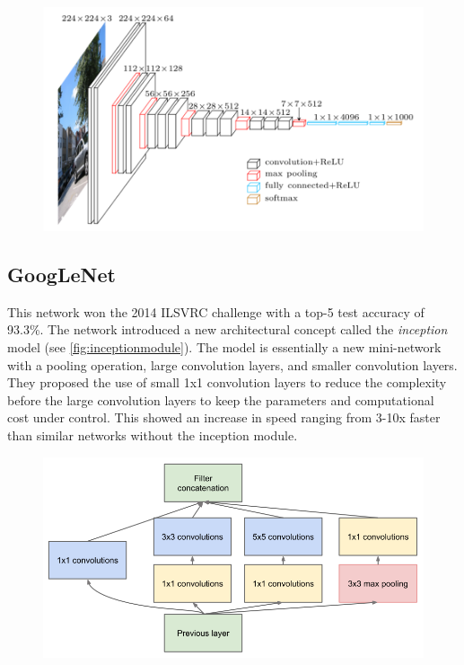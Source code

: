 \begin{figure}[H]
	\centering
	\includegraphics[width=0.7\linewidth]{fig/vgg16.png}
	\label{fig:vgg}
\end{figure}


\subsection{GoogLeNet}
This network won the 2014 ILSVRC challenge with a top-5 test accuracy of 93.3\%. The network introduced a new architectural concept called the \emph{inception} model (see \autoref{fig:inceptionmodule}). The model is essentially a new mini-network with a pooling operation, large convolution layers, and smaller convolution layers. They proposed the use of small 1x1 convolution layers to reduce the complexity before the large convolution layers to keep the parameters and computational cost under control. This showed an increase in speed ranging from 3-10x faster than similar networks without the inception module.

\begin{figure}[H]
	\centering
	\includegraphics[width=0.7\linewidth]{fig/googlenet.png}
	\label{fig:inceptionmodule}
\end{figure}


